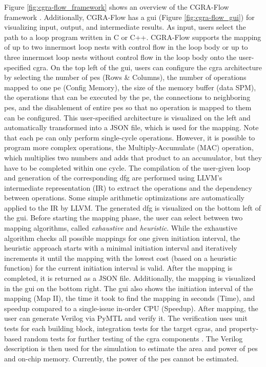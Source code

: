     Figure \ref{fig:cgra-flow_framework} shows an overview of the CGRA-Flow framework \cite{4_OpenCGRA}.
    Additionally, CGRA-Flow has a \acf{gui} (Figure \ref{fig:cgra-flow_gui}) for visualizing input, output, and intermediate results.
    As input, users select the path to a loop program written in C or C++.
    CGRA-Flow supports the mapping of up to two innermost loop nests with control flow in the loop body or up to three innermost loop nests without control flow in the loop body onto the user-specified \ac{cgra}. 
    On the top left of the \ac{gui}, users can configure the \ac{cgra} architecture by selecting the number of \acp{pe} (Rows \& Columns), the number of operations mapped to one \ac{pe} (Config Memory), the size of the memory buffer (data SPM), the operations that can be executed by the \ac{pe}, the connections to neighboring \acp{pe}, and the disablement of entire \acp{pe} so that no operation is mapped to them can be configured.
    This user-specified architecture is visualized on the left and automatically transformed into a JSON file, which is used for the mapping.
    Note that each \ac{pe} can only perform single-cycle operations.
    However, it is possible to program more complex operations, \eg the Multiply-Accumulate (MAC) operation, which multiplies two numbers and adds that product to an accumulator, but they have to be completed within one cycle. 
    The compilation of the user-given loop and generation of the corresponding \acf{dfg} are performed using LLVM's\cite{LLVM} intermediate representation (IR) to extract the operations and the dependency between operations.
    Some simple arithmetic optimizations are automatically applied to the IR by LLVM.
    The generated \ac{dfg} is visualized on the bottom left of the \ac{gui}.
    Before starting the mapping phase, the user can select between two mapping algorithms, called \textit{exhaustive} and \textit{heuristic}.
    While the exhaustive algorithm checks all possible mappings for one given initiation interval, the heuristic approach starts with a minimal initiation interval and iteratively increments it until the mapping with the lowest cost (based on a heuristic function) for the current initiation interval is valid.
    After the mapping is completed, it is returned as a JSON file.
    Additionally, the mapping is visualized in the \ac{gui} on the bottom right.
    The \ac{gui} also shows the initiation interval of the mapping (Map II), the time it took to find the mapping in seconds (Time), and speedup compared to a single-issue in-order CPU (Speedup).
    After mapping, the user can generate Verilog via PyMTL and verify it.
    The verification uses unit tests for each building block, integration tests for the target \acp{cgra}, and property-based random tests for further testing of the \ac{cgra} components \cite{4_OpenCGRA}.
    The Verilog description is then used for the simulation to estimate the area and power of \acp{pe} and on-chip memory.
    Currently, the power of the \acp{pe} cannot be estimated.

